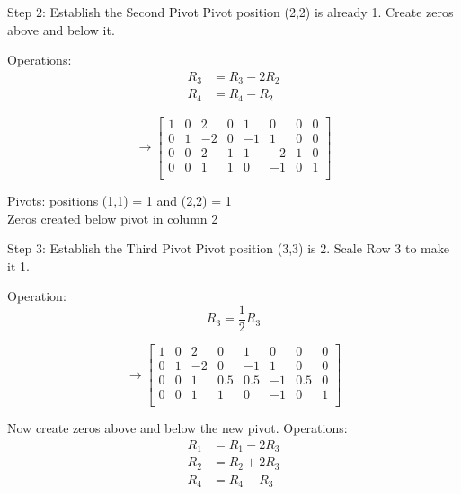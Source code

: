 \documentclass[aspectratio=169,xcolor=dvipsnames,svgnames,x11names,fleqn]{beamer}
\begin{document}
\begin{frame}{Step 2: Establish the Second Pivot}
    \footnotesize
\centering
Pivot position (2,2) is already \alert{1}. Create zeros above and below it.

\vspace{3mm}
Operations:
\begin{align*}
R_3 &= R_3 - 2R_2 \\
R_4 &= R_4 - R_2
\end{align*}

\vspace{3mm}
$$
\rightarrow \left[\begin{array}{cccc|cccc}
1 & 0 & 2 & 0 & 1 & 0 & 0 & 0 \\
0 & 1 & -2 & 0 & -1 & 1 & 0 & 0 \\
0 & 0 & 2 & 1 & 1 & -2 & 1 & 0 \\
0 & 0 & 1 & 1 & 0 & -1 & 0 & 1 \\
\end{array}\right]
$$

\vspace{3mm}
\colorbox{red!20}{Pivots: positions (1,1) = 1 and (2,2) = 1} \\
\colorbox{blue!20}{Zeros created below pivot in column 2}
\end{frame}

\begin{frame}{Step 3: Establish the Third Pivot}
        \footnotesize
\centering
Pivot position (3,3) is \alert{2}. Scale Row 3 to make it \alert{1}.

\vspace{3mm}
Operation:
$$
R_3 = \frac{1}{2} R_3
$$

\vspace{3mm}
$$
\rightarrow \left[\begin{array}{cccc|cccc}
1 & 0 & 2 & 0 & 1 & 0 & 0 & 0 \\
0 & 1 & -2 & 0 & -1 & 1 & 0 & 0 \\
0 & 0 & 1 & 0.5 & 0.5 & -1 & 0.5 & 0 \\
0 & 0 & 1 & 1 & 0 & -1 & 0 & 1 \\
\end{array}\right]
$$

\vspace{3mm}
Now create zeros above and below the new pivot.
\vspace{3mm}
Operations:
\begin{align*}
R_1 &= R_1 - 2R_3 \\
R_2 &= R_2 + 2R_3 \\
R_4 &= R_4 - R_3
\end{align*}
\end{frame}
\end{document}
